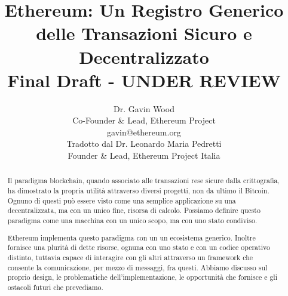\documentclass[9pt,oneside]{amsart}
\title{Ethereum: Un Registro Generico delle Transazioni Sicuro e Decentralizzato \\ {\smaller \textbf{Final Draft - UNDER REVIEW}}}
\author{
    Dr. Gavin Wood\\
    Co-Founder \& Lead, Ethereum Project\\
    gavin@ethereum.org\\
    Tradotto dal Dr. Leonardo Maria Pedretti\\
    Founder \& Lead, Ethereum Project Italia\\
}
\begin{document}
\pagecolor{lightyellow}

\begin{abstract}
Il paradigma blockchain, quando associato alle transazioni rese sicure dalla crittografia, ha dimostrato la propria utilità attraverso diversi progetti, non da ultimo il Bitcoin. Ognuno di questi può essere visto come una semplice applicazione su una decentralizzata, ma con un unico fine, risorsa di calcolo. Possiamo definire questo paradigma come una macchina con un unico scopo, ma con uno stato condiviso.

Ethereum implementa questo paradigma con un un ecosistema generico. Inoltre fornisce una plurità di dette risorse, ognuna con uno stato e con un codice operativo distinto, tuttavia capace di interagire con gli altri attraverso un framework che consente la comunicazione, per mezzo di messaggi, fra questi. Abbiamo discusso sul proprio design, le problematiche dell'implementazione, le opportunità che fornisce e gli ostacoli futuri che prevediamo.
\end{abstract}

\maketitle
\end{document}
